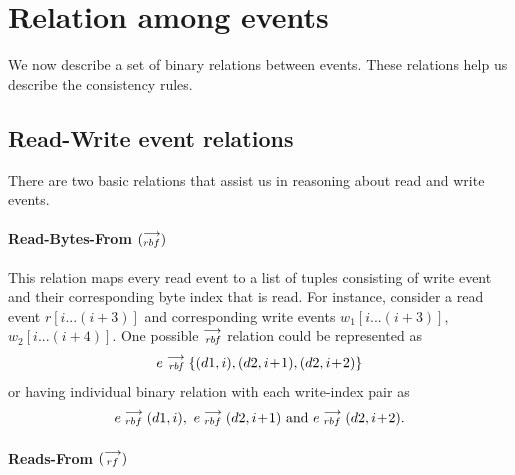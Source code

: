     \section{Relation among events}
        We now describe a set of binary relations between events. These relations help us describe the consistency rules.
        
        \subsection{Read-Write event relations}
        There are two basic relations that assist us in reasoning about read and write events.
        
            \paragraph{Read-Bytes-From $(\stackrel{\longrightarrow}{_{rbf}})$}
            
            This relation maps every read event to a list of tuples consisting of write event and their corresponding byte index that is read. For instance, consider a read event $r[i...(i+3)]$ and corresponding write events $w_1[i...(i+3)]$, $w_2[i...(i+4)]$. One possible $\stackrel{\longrightarrow}{_\textit{rbf}}$ relation could be represented as  
                \begin{align*}
                    e\stackrel{\longrightarrow}{_{\textit{rbf}}}\{(d1, i), (d2, i\!+\!1), (d2, i\!+\!2)\}     
                \end{align*}   
            or having individual binary relation with each write-index pair as 
            \begin{align*}
                e\stackrel{\longrightarrow}{_{rbf}}(d1, i),\ e\stackrel{\longrightarrow}{_{rbf}}(d2, i\!+\!1)  \text{ and } e\stackrel{\longrightarrow}{_{rbf}}(d2, i\!+\!2).
            \end{align*}
            
            \paragraph{Reads-From $(\stackrel{\longrightarrow}{_{rf}})$}
            

